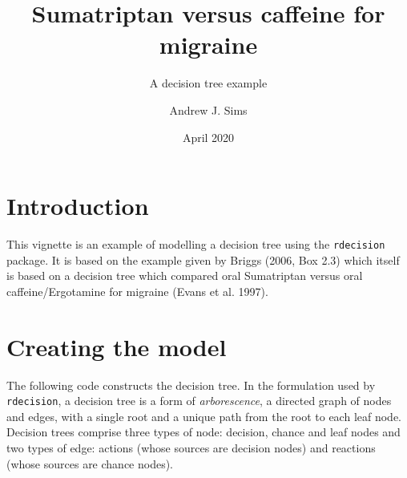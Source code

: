 \documentclass[
]{article}
\title{Sumatriptan versus caffeine for migraine}
\subtitle{A decision tree example}
\author{Andrew J. Sims}
\date{April 2020}
\begin{document}
\maketitle

\hypertarget{introduction}{%
\section{Introduction}\label{introduction}}

This vignette is an example of modelling a decision tree using the
\texttt{rdecision} package. It is based on the example given by Briggs
(2006, Box 2.3) which itself is based on a decision tree which compared
oral Sumatriptan versus oral caffeine/Ergotamine for migraine (Evans et
al. 1997).

\hypertarget{creating-the-model}{%
\section{Creating the model}\label{creating-the-model}}

The following code constructs the decision tree. In the formulation used
by \texttt{rdecision}, a decision tree is a form of \emph{arborescence},
a directed graph of nodes and edges, with a single root and a unique
path from the root to each leaf node. Decision trees comprise three
types of node: decision, chance and leaf nodes and two types of edge:
actions (whose sources are decision nodes) and reactions (whose sources
are chance nodes).
\end{document}
